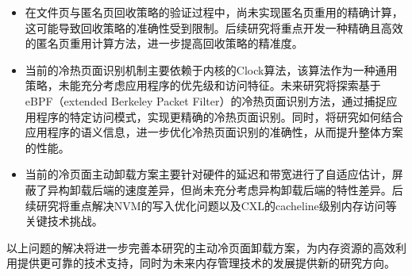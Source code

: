 \begin{itemize}
    \item 在文件页与匿名页回收策略的验证过程中，尚未实现匿名页重用的精确计算，这可能导致回收策略的准确性受到限制。后续研究将重点开发一种精确且高效的匿名页重用计算方法，进一步提高回收策略的精准度。

    \item 当前的冷热页面识别机制主要依赖于内核的Clock算法，该算法作为一种通用策略，未能充分考虑应用程序的优先级和访问特征。未来研究将探索基于eBPF（extended Berkeley Packet Filter）的冷热页面识别方法，通过捕捉应用程序的特定访问模式，实现更精确的冷热页面识别。同时，将研究如何结合应用程序的语义信息，进一步优化冷热页面识别的准确性，从而提升整体方案的性能。

    \item 当前的冷页面主动卸载方案主要针对硬件的延迟和带宽进行了自适应估计，屏蔽了异构卸载后端的速度差异，但尚未充分考虑异构卸载后端的特性差异。后续研究将重点解决NVM的写入优化问题以及CXL的cacheline级别内存访问等关键技术挑战。

\end{itemize}

以上问题的解决将进一步完善本研究的主动冷页面卸载方案，为内存资源的高效利用提供更可靠的技术支持，同时为未来内存管理技术的发展提供新的研究方向。